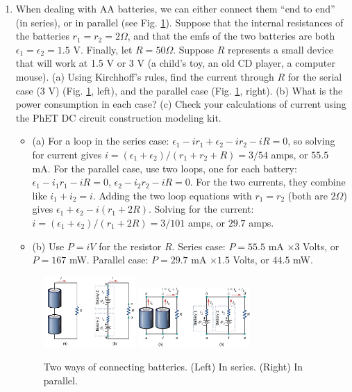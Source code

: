 \documentclass[10pt]{article}
\begin{document}
\begin{enumerate}

\item When dealing with AA batteries, we can either connect them ``end to end'' (in series), or in parallel (see Fig. \ref{fig:ohm1}).  Suppose that the internal resistances of the batteries $r_1 = r_2 = 2 \Omega$, and that the emfs of the two batteries are both $\epsilon_1 = \epsilon_2 = 1.5$ V.  Finally, let $R = 50 \Omega$.  Suppose $R$ represents a small device that will work at 1.5 V or 3 V (a child's toy, an old CD player, a computer mouse).  (a) Using Kirchhoff's rules, find the current through $R$ for the serial case (3 V) (Fig. \ref{fig:ohm1}, left), and the parallel case (Fig. \ref{fig:ohm1}, right).  (b) What is the power consumption in each case?  (c) Check your calculations of current using the PhET DC circuit construction modeling kit.
\begin{itemize}
\item (a) For a loop in the series case: $\epsilon_1 - i r_1 + \epsilon_2 - i r_2 - i R = 0$, so solving for current gives $i = (\epsilon_1 + \epsilon_2) / (r_1 + r_2 + R) = 3/54$ amps, or $55.5$ mA. For the parallel case, use two loops, one for each battery: $\epsilon_1 - i_1 r_1 - i R = 0$, $\epsilon_2 - i_2 r_2 - i R = 0$.  For the two currents, they combine like $i_1 + i_2 = i$.  Adding the two loop equations with $r_1 = r_2$ (both are $2\Omega$) gives $\epsilon_1 + \epsilon_2 - i(r_1 + 2R)$.  Solving for the current: $i = (\epsilon_1 + \epsilon_2) / (r_1 + 2 R) = 3/101$ amps, or $29.7$ amps.
\item (b) Use $P = iV$ for the resistor $R$.  Series case: $P = 55.5$ mA $\times 3$ Volts, or $P = 167$ mW.  Parallel case: $P = 29.7$ mA $\times 1.5$ Volts, or $44.5$ mW.
\end{itemize}

\begin{figure}[hb]
\centering
\includegraphics[width=0.33\textwidth]{figures/ohm2.png} \hspace{1cm}
\includegraphics[width=0.4\textwidth]{figures/battery2.jpeg}
\caption{\label{fig:ohm1} Two ways of connecting batteries.  (Left) In series. (Right) In parallel.}
\end{figure}


\end{enumerate}
\end{document}
